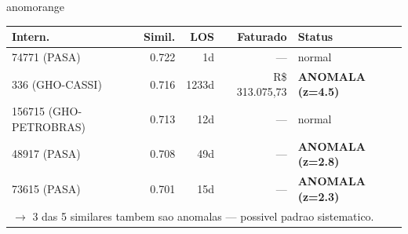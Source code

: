 \documentclass[a4paper,10pt]{article}
\begin{document}
\begin{anomalycard}[Internacao 118873 | GHO-BRADESCO | ALTO (z=3.90)]{anomorange}
\begin{tabular}{l r r r l}\toprule\textbf{Intern.} & \textbf{Simil.} & \textbf{LOS} & \textbf{Faturado} & \textbf{Status} \\\midrule
74771 (PASA) & 0.722 & 1d & --- & \textcolor{jcubeblue}{normal} \\
336 (GHO-CASSI) & 0.716 & 1233d & R\$ 313.075,73 & \textcolor{anomred}{\textbf{ANOMALA (z=4.5)}} \\
156715 (GHO-PETROBRAS) & 0.713 & 12d & --- & \textcolor{jcubeblue}{normal} \\
48917 (PASA) & 0.708 & 49d & --- & \textcolor{anomred}{\textbf{ANOMALA (z=2.8)}} \\
73615 (PASA) & 0.701 & 15d & --- & \textcolor{anomred}{\textbf{ANOMALA (z=2.3)}} \\
\multicolumn{5}{l}{\textcolor{anomred}{\small $\rightarrow$ 3 das 5 similares tambem sao anomalas --- possivel padrao sistematico.}} \\
\bottomrule\end{tabular}


\end{anomalycard}

\newpage
\end{document}

